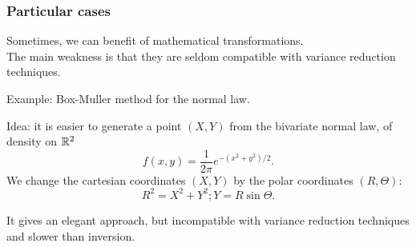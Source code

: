 \documentclass{beamer}
\begin{document}
	\begin{frame}
		\frametitle{Particular cases}
		
		Sometimes, we can benefit of mathematical transformations.\\
		The main weakness is that they are seldom compatible with variance
		reduction techniques.
		
		\mbox{}
		
		{\blue Example}: Box-Muller method for the normal law.
		
		\mbox{}
		
		{\red Idea}: it is easier to generate a point $(X, Y)$ from the bivariate
		normal law, of density on $\mathbb{R}^2$
		\[
		f (x, y ) = \frac{1}{2\pi} e^{-(x^2 +y^2 )/2}.
		\]
		We change the cartesian coordinates $(X,Y)$ by the polar coordinates $(R, \Theta)$:\\
		\[
		R^2 = X^2 + Y^2 ; Y = R \sin \Theta.
		\]
		
		It gives an elegant approach, but incompatible with variance reduction techniques and slower than inversion.
		
	\end{frame}
	
\end{document}
